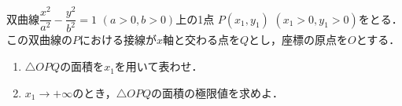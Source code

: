\documentclass[../../main.tex]{subfiles}
\begin{document}
双曲線$\displaystyle\dfrac{x^2}{a^2}-\dfrac{y^2}{b^2}=1$ $(a>0,b>0)$上の1点
$P(x_1,y_1)$ $(x_1>0,y_1>0)$をとる．
この双曲線の$P$における接線が$x$軸と交わる点を$Q$とし，座標の原点を$O$とする．
\begin{enumerate}
  \item $\triangle OPQ$の面積を$x_1$を用いて表わせ．
  \item $x_1\to+\infty$のとき，$\triangle OPQ$の面積の極限値を求めよ．
\end{enumerate}
\end{document}
